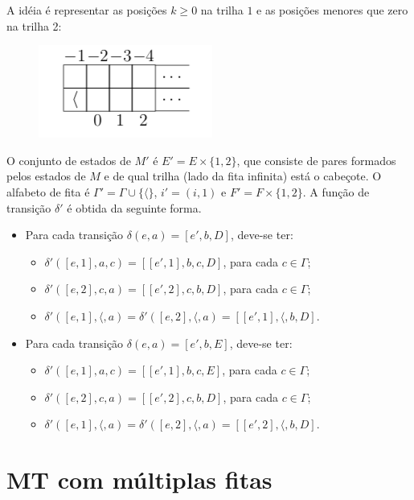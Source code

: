 \documentclass[a4paper]{article}
\theoremstyle{definition}
\begin{document}
  A idéia é representar as posições $k \geq 0$ na trilha $1$ e as posições 
  menores que zero na trilha 2:

  \begin{figure}[H]
    \includegraphics[scale=.8]{2tracks.png}
    \centering
  \end{figure}

  O conjunto de estados de $M'$ é $E' = E \times \{1,2\}$, que consiste de pares
  formados pelos estados de $M$ e de qual trilha (lado da fita infinita) está o
  cabeçote. O alfabeto de fita é $\Gamma' = \Gamma \cup \{\langle\}$, $i' =
  (i,1)$ e $F' = F \times \{1,2\}$. A função de transição $\delta'$ é obtida
  da seguinte forma.

  \begin{itemize}
    \item Para cada transição $\delta(e,a) = [e',b,D]$, deve-se ter: 
    \begin{itemize}
      \item $\delta'([e,1],a,c) = [[e',1],b,c,D]$, para cada $c\in \Gamma$;
      \item $\delta'([e,2],c,a) = [[e',2],c,b,D]$, para cada $c\in \Gamma$;
      \item $\delta'([e,1],\langle,a) = \delta'([e,2],\langle,a) =
        [[e',1],\langle, b,D]$.
    \end{itemize}
    \item  Para cada transição $\delta(e,a) = [e',b,E]$, deve-se ter:
    \begin{itemize}
      \item $\delta'([e,1],a,c) = [[e',1],b,c,E]$, para cada $c\in \Gamma$;
      \item $\delta'([e,2],c,a) = [[e',2],c,b,D]$, para cada $c\in \Gamma$;
      \item $\delta'([e,1],\langle,a) = \delta'([e,2],\langle,a) =
        [[e',2],\langle, b,D]$.
    \end{itemize}    
  \end{itemize}


  \section{MT com múltiplas fitas}
\end{document}

